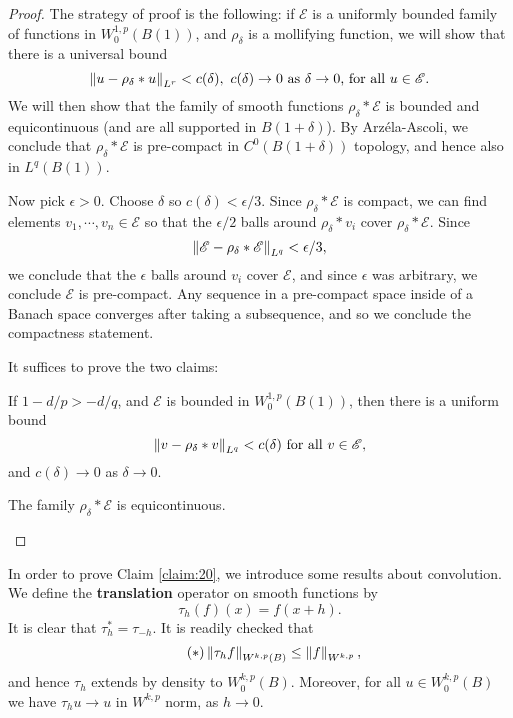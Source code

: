 \begin{proof}
  The strategy of proof is the following: if $\mathscr{E}$ is a uniformly bounded family of functions in $W^{1,p}_{0}(B(1))$, and $\rho_{\delta}$ is a mollifying function, we will show that there is a universal bound
  \begin{equation*}
    \left\lVert u-\rho_{\delta}\ast u\right\rVert_{L^{r}}<c(\delta),\text{ $c(\delta)\to 0$ as $\delta\to 0$, for all $u\in \mathscr{E}$}.
  \end{equation*}
  We will then show that the family of smooth functions $\rho_{\delta}\ast \mathscr{E}$ is bounded and equicontinuous (and are all supported in $B(1+\delta)$). By Arz\'ela-Ascoli, we conclude that $\rho_{\delta}\ast\mathscr{E}$ is pre-compact in $C^{0}(B(1+\delta))$ topology, and hence also in $L^{q}(B(1))$.

  Now pick $\epsilon>0$. Choose $\delta$ so $c(\delta)<\epsilon/3$. Since $\rho_{\delta}\ast \mathscr{E}$ is compact, we can find elements $v_{1},\cdots,v_{n}\in \mathscr{E}$ so that the $\epsilon/2$ balls around $\rho_{\delta}\ast v_{i}$ cover $\rho_{\delta}\ast\mathscr{E}$. Since
  \begin{equation*}
    \left\lVert\mathscr{E}-\rho_{\delta}\ast\mathscr{E}\right\rVert
    _{L^{q}}<\epsilon/3,
  \end{equation*}
  we conclude that the $\epsilon$ balls around $v_{i}$ cover $\mathscr{E}$, and since $\epsilon$ was arbitrary, we conclude $\mathscr{E}$ is pre-compact. Any sequence in a pre-compact space inside of a Banach space converges after taking a subsequence, and so we conclude the compactness statement.

  It suffices to prove the two claims:
  \begin{claim}\label{claim:20}
    If $1-d/p>-d/q$, and $\mathscr{E}$ is bounded in $W^{1,p}_{0}(B(1))$, then there is a uniform bound
    \begin{equation*}      \left\lVert v-\rho_{\delta}\ast v\right\rVert_{L^{q}}<c(\delta)\text{ for all $v\in \mathscr{E}$},
    \end{equation*}
    and $c(\delta)\to 0$ as $\delta\to 0$.
  \end{claim}
  \begin{claim}\label{claim:21}
    The family $\rho_{\delta}\ast \mathscr{E}$ is equicontinuous. 
  \end{claim}
\end{proof}
In order to prove Claim \ref{claim:20}, we introduce some results about convolution. We define the \textbf{translation} operator on smooth functions by
\begin{equation*}
  \tau_{h}(f)(x)=f(x+h).
\end{equation*}
It is clear that $\tau_{h}^{*}=\tau_{-h}$. It is readily checked that
\begin{equation*}\tag{$\ast$}
  \left\lVert\tau_{h}f\right\rVert_{W^{k,p}(B)}\le \left\lVert f\right\rVert_{W^{k,p}},
\end{equation*}
and hence $\tau_{h}$ extends by density to $W^{k,p}_{0}(B)$. Moreover, for all $u\in W^{k,p}_{0}(B)$ we have $\tau_{h}u\to u$ in $W^{k,p}$ norm, as $h\to 0$.

